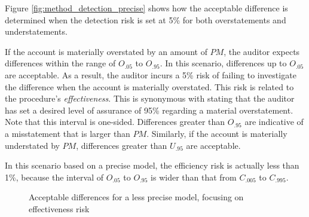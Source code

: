 Figure \ref{fig:method_detection_precise}\label{mar:controlling_effectiveness_risk} shows how the acceptable difference is determined when the detection risk is set at 5\% for both overstatements and understatements. 

If the account is materially overstated by an amount of $PM$, the auditor expects differences within the range of $O_{.05}$ to $O_{.95}$. In this scenario, differences up to $O_{.05}$ are acceptable. As a result, the auditor incurs a 5\% risk of failing to investigate the difference when the account is materially overstated. This risk is related to the procedure's \emph{effectiveness}. This is synonymous with stating that the auditor has set a desired level of assurance of 95\% regarding a material overstatement. Note that this interval is one-sided. Differences greater than $O_{.95}$ are indicative of a misstatement that is larger than $PM$. Similarly, if the account is materially understated by $PM$, differences greater than $U_{.95}$ are acceptable. 

In this scenario based on a precise model, the efficiency risk is actually less than 1\%, because the interval of $O_{.05}$ to $O_{.95}$ is wider than that from $C_{.005}$ to $C_{.995}$.

\begin{figure}[htbp]
\begin{center}
\caption{Acceptable differences for a less precise model, focusing on effectiveness risk}

\label{fig:method_detection_less_precise}
\end{center}
\end{figure}

